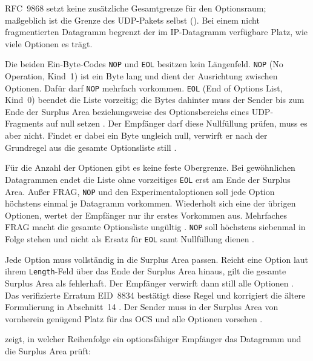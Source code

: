 RFC~9868 setzt keine zusätzliche Gesamtgrenze für den Optionsraum; maßgeblich ist die Grenze des UDP-Pakets
selbst (). Bei einem nicht fragmentierten Datagramm begrenzt der im
IP-Datagramm verfügbare Platz, wie viele Optionen es trägt.

Die beiden Ein-Byte-Codes \texttt{NOP} und \texttt{EOL} besitzen kein Längenfeld. \texttt{NOP}
(No Operation, Kind~1) ist ein Byte lang und dient der Ausrichtung zwischen Optionen. Dafür darf
\texttt{NOP} mehrfach vorkommen.
\texttt{EOL} (End of Options List, Kind~0) beendet die Liste vorzeitig; die Bytes dahinter muss der Sender
bis zum Ende der Surplus Area beziehungsweise des Optionsbereichs eines UDP-Fragments auf null setzen
\cite[Sec.~8 und 11.1]{rfc9868}. Der Empfänger darf diese Nullfüllung prüfen, muss es aber nicht. Findet er
dabei ein Byte ungleich null, verwirft er nach der Grundregel aus  die gesamte
Optionsliste still \cite[Sec.~11.1]{rfc9868}.

Für die Anzahl der Optionen gibt es keine feste Obergrenze. Bei gewöhnlichen Datagrammen endet die Liste
ohne vorzeitiges \texttt{EOL} erst am Ende der Surplus Area. Außer FRAG, \texttt{NOP} und den
Experimentaloptionen soll jede Option höchstens einmal je Datagramm vorkommen. Wiederholt sich eine der
übrigen Optionen, wertet der Empfänger nur ihr erstes Vorkommen aus. Mehrfaches FRAG macht die gesamte
Optionsliste ungültig \cite[Sec.~10]{rfc9868}. \texttt{NOP} soll höchstens siebenmal in Folge stehen und
nicht als Ersatz für \texttt{EOL} samt Nullfüllung dienen \cite[Sec.~11.2]{rfc9868}.

Jede Option muss vollständig in die Surplus Area passen. Reicht eine Option laut ihrem
\texttt{Length}-Feld über das Ende der Surplus Area hinaus, gilt die gesamte Surplus Area als fehlerhaft.
Der Empfänger verwirft dann still alle Optionen \cite[Sec.~10]{rfc9868}. Das verifizierte Erratum EID~8834
bestätigt diese Regel und korrigiert die ältere Formulierung in Abschnitt~14 \cite{rfc9868-eid8834}. Der
Sender muss in der Surplus Area von vornherein genügend Platz für das OCS und alle Optionen vorsehen
\cite[Sec.~8]{rfc9868}.

 zeigt, in welcher Reihenfolge ein optionsfähiger Empfänger das Datagramm und
die Surplus Area prüft:

